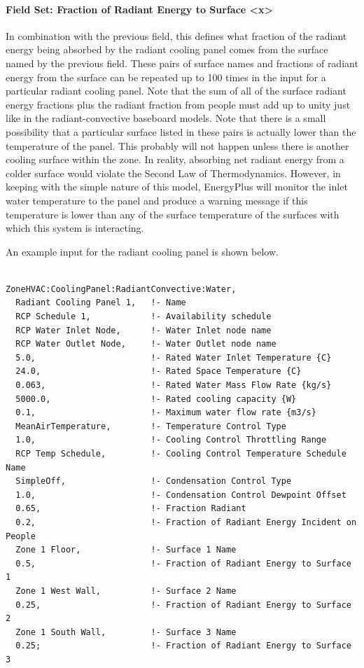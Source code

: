 \paragraph{Field Set: Fraction of Radiant Energy to Surface \textless{}x\textgreater{}}\label{field-set-fraction-of-radiant-energy-to-surface-x-1}

In combination with the previous field, this defines what fraction of the radiant energy being absorbed by the radiant cooling panel comes from the surface named by the previous field.  These pairs of surface names and fractions of radiant energy from the surface can be repeated up to 100 times in the input for a particular radiant cooling panel.  Note that the sum of all of the surface radiant energy fractions plus the radiant fraction from people must add up to unity just like in the radiant-convective baseboard models.  Note that there is a small possibility that a particular surface listed in these pairs is actually lower than the temperature of the panel.  This probably will not happen unless there is another cooling surface within the zone.  In reality, absorbing net radiant energy from a colder surface would violate the Second Law of Thermodynamics.  However, in keeping with the simple nature of this model, EnergyPlus will monitor the inlet water temperature to the panel and produce a warning message if this temperature is lower than any of the surface temperature of the surfaces with which this system is interacting.

An example input for the radiant cooling panel is shown below.

\begin{lstlisting}

ZoneHVAC:CoolingPanel:RadiantConvective:Water,
  Radiant Cooling Panel 1,   !- Name
  RCP Schedule 1,            !- Availability schedule
  RCP Water Inlet Node,      !- Water Inlet node name
  RCP Water Outlet Node,     !- Water Outlet node name
  5.0,                       !- Rated Water Inlet Temperature {C}
  24.0,                      !- Rated Space Temperature {C}
  0.063,                     !- Rated Water Mass Flow Rate {kg/s}
  5000.0,                    !- Rated cooling capacity {W}
  0.1,                       !- Maximum water flow rate {m3/s}
  MeanAirTemperature,        !- Temperature Control Type
  1.0,                       !- Cooling Control Throttling Range
  RCP Temp Schedule,         !- Cooling Control Temperature Schedule Name
  SimpleOff,                 !- Condensation Control Type
  1.0,                       !- Condensation Control Dewpoint Offset
  0.65,                      !- Fraction Radiant
  0.2,                       !- Fraction of Radiant Energy Incident on People
  Zone 1 Floor,              !- Surface 1 Name
  0.5,                       !- Fraction of Radiant Energy to Surface 1
  Zone 1 West Wall,          !- Surface 2 Name
  0.25,                      !- Fraction of Radiant Energy to Surface 2
  Zone 1 South Wall,         !- Surface 3 Name
  0.25;                      !- Fraction of Radiant Energy to Surface 3
\end{lstlisting}

